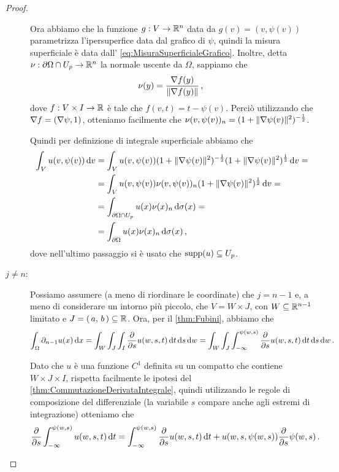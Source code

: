 \begin{proof}
\begin{description}
			Ora abbiamo che la funzione $g:V\rightarrow \mathbb R^n$ data da $g(v)=(v,\psi(v))$ parametrizza l'ipersuperfice data dal grafico di
			$\psi$, quindi la misura superficiale è data dall' \cref{eq:MisuraSuperficialeGrafico}.
			Inoltre, detta $\nu:\partial \Omega \cap U_p \rightarrow \mathbb R^n$ la normale uscente da $\Omega$, sappiamo che
			\begin{equation*}
				\nu(y)=\frac{\nabla f(y)}{\lVert \nabla f(y) \rVert}\, \text{, }
			\end{equation*}
			dove $f:V\times I\to\mathbb R$ è tale che $f(v,t)=t-\psi(v)$. Perciò utilizzando che $\nabla f=(\nabla \psi, 1)$, otteniamo facilmente che $\nu(v,\psi(v))_n=(1+\lVert\nabla\psi(v)\rVert^2)^{-\frac{1}{2}}$.
			
			Quindi per definizione di integrale superficiale abbiamo che
			\begin{align*}
				\int_V u(v,\psi(v)) \,\mathrm d v &= \int_V u(v,\psi(v)) (1+\lVert\nabla\psi(v)\rVert^2)^{-\frac{1}{2}} (1+\lVert\nabla\psi(v)\rVert^2)^{\frac{1}{2}} \,\mathrm d v = \\
				& = \int_V u(v,\psi(v)) \nu(v,\psi(v))_n (1+\lVert\nabla\psi(v)\rVert^2)^{\frac{1}{2}} \,\mathrm d v = \\
				& = \int_{\partial \Omega \cap U_p} u(x) \nu(x)_n \,\mathrm d \sigma(x) = \\
				& = \int_{\partial \Omega} u(x) \nu(x)_n \,\mathrm d \sigma(x)\, \text{, }
			\end{align*}
			dove nell'ultimo passaggio si è usato che $\operatorname{supp}(u)\subseteq U_p$.
		\item [$j\neq n$:] Possiamo assumere (a meno di riordinare le coordinate) che $j=n-1$ e, a meno di considerare un intorno più piccolo,
			che $V=W \times J$, con $W\subseteq \mathbb R^{n-1}$ limitato e $J=\left(\,a,\,b\,\right)\subseteq \mathbb R$. Ora, per il \cref{thm:Fubini}, abbiamo che
			\[
				\int_{\Omega} \partial_{n-1} u(x) \,\mathrm d x = \int_W \int_J \int_I \frac{\partial}{\partial s} u(w,s,t) \,\mathrm d t \,\mathrm d s \,\mathrm d w=\int_W \int_J \int_{-\infty}^{\psi(w,s)} \frac{\partial}{\partial s} u(w,s,t) \,\mathrm d t \,\mathrm d s \,\mathrm d w\, \text{. }
			\]
			
			Dato che $u$ è una funzione $C^1$ definita su un compatto che contiene $W\times J\times I$, rispetta facilmente le ipotesi del \cref{thm:CommutazioneDerivataIntegrale}, quindi utilizzando le regole di composizione del differenziale (la variabile $s$ compare anche agli estremi di integrazione) otteniamo che
			\[
				\frac{\partial}{\partial s} \int_{-\infty}^{\psi(w,s)} u(w,s,t) \,\mathrm d t =
				\int_{-\infty}^{\psi(w,s)} \frac\partial{\partial s} u(w,s,t) \,\mathrm d t + u(w,s,\psi(w,s))\frac\partial{\partial s} \psi (w,s)\, \text{. }
			\]
			

\end{description}
\end{proof}
